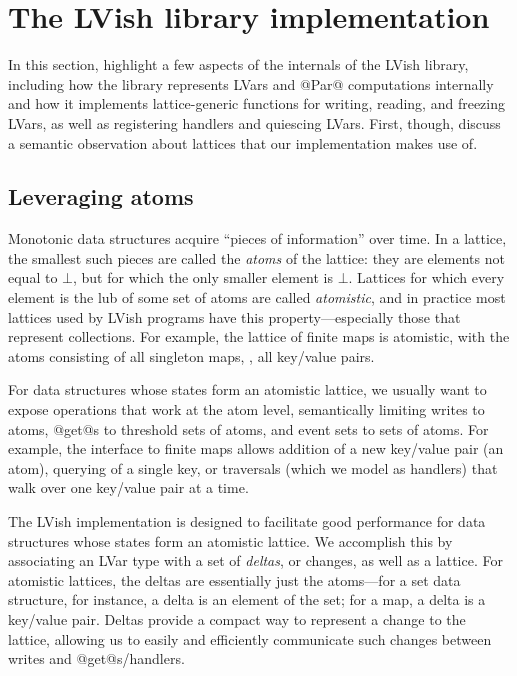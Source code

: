 \section{The LVish library implementation}\label{s:lvish-internals}

In this section,  highlight a few aspects of the
internals of the LVish library, including how the library represents
LVars and @Par@ computations internally and how it implements
lattice-generic functions for writing, reading, and freezing LVars, as
well as registering handlers and quiescing LVars.  First, though,
 discuss a semantic observation about lattices that our
implementation makes use of.

\subsection{Leveraging atoms}\label{subsection:lvish-leveraging-atoms}

Monotonic data structures acquire ``pieces of information'' over time.
In a lattice, the smallest such pieces are called the \emph{atoms} of
the lattice: they are elements not equal to $\bot$, but for which the
only smaller element is $\bot$.  Lattices for which every element is
the lub of some set of atoms are called \emph{atomistic}, and in
practice most lattices used by LVish programs have this
property---especially those that represent collections.  For example,
the lattice of finite maps is atomistic, with the atoms consisting of
all singleton maps, \ie, all key/value pairs.

For data structures whose states form an atomistic lattice, we usually
want to expose operations that work at the atom level, semantically
limiting writes to atoms, @get@s to threshold sets of atoms, and event
sets to sets of atoms.  For example, the interface to finite maps
allows addition of a new key/value pair (an atom), querying of a
single key, or traversals (which we model as handlers) that walk over
one key/value pair at a time.

The LVish implementation is designed to facilitate good performance
for data structures whose states form an atomistic lattice.  We
accomplish this by associating an LVar type with a set of
\emph{deltas}, or changes, as well as a lattice.  For atomistic
lattices, the deltas are essentially just the atoms---for a set
data structure, for instance, a delta is an element of the set; for a
map, a delta is a key/value pair.  Deltas provide a compact way to
represent a change to the lattice, allowing us to easily and
efficiently communicate such changes between writes and
@get@s/handlers.

